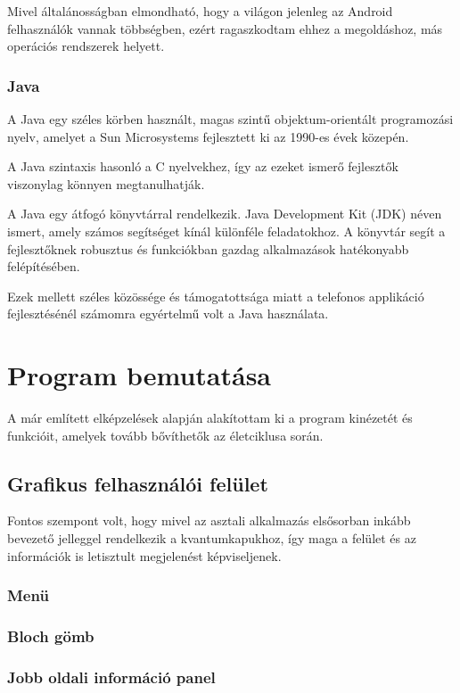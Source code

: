 \documentclass[
]{thesis-ekf}
\theoremstyle{definition}
\theoremstyle{remark}
\begin{document}
Mivel általánosságban elmondható, hogy a világon jelenleg az Android felhasználók vannak többségben, ezért ragaszkodtam ehhez a megoldáshoz, más operációs rendszerek helyett.

\subsubsection{Java}
A Java egy széles körben használt, magas szintű objektum-orientált programozási nyelv, amelyet a Sun Microsystems fejlesztett ki az 1990-es évek közepén. 

A Java szintaxis hasonló a C nyelvekhez, így az ezeket ismerő fejlesztők viszonylag könnyen megtanulhatják. 

A Java egy átfogó könyvtárral rendelkezik. Java Development Kit (JDK) néven ismert, amely számos segítséget kínál különféle feladatokhoz. A könyvtár segít a fejlesztőknek robusztus és funkciókban gazdag alkalmazások hatékonyabb felépítésében.

Ezek mellett széles közössége és támogatottsága miatt a telefonos applikáció fejlesztésénél számomra egyértelmű volt a Java használata.

\section{Program bemutatása}
A már említett elképzelések alapján alakítottam ki a program kinézetét és funkcióit, amelyek tovább bővíthetők az életciklusa során.

\subsection{Grafikus felhasználói felület}
Fontos szempont volt, hogy mivel az asztali alkalmazás elsősorban inkább bevezető jelleggel rendelkezik a kvantumkapukhoz, így maga a felület és az információk  is letisztult megjelenést képviseljenek.

\subsubsection{Menü}

\subsubsection{Bloch gömb}

\subsubsection{Jobb oldali információ panel}
\end{document}

